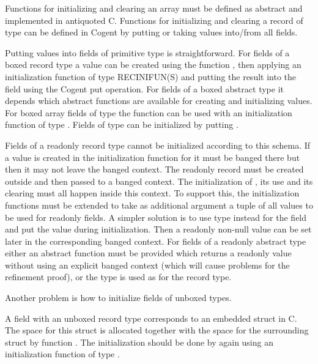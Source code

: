 Functions for initializing and clearing an array must be defined as abstract and implemented in antiquoted C. Functions
for initializing and clearing a record  of type  can be defined in Cogent by putting or taking values 
into/from all fields.

Putting values into fields of primitive type is straightforward. For fields of a boxed record type  a value can be created 
using the function , then applying an initialization function of type RECINIFUN(S) and putting the result into the field using the
Cogent put operation. For fields of a boxed abstract type it depends which abstract functions are available for creating and 
initializing values. For boxed array fields of type  the function  can be used 
with an initialization function of type . Fields of type  can be initialized by
putting .

Fields of a readonly record type  cannot be initialized according to this schema. If a value is created in the 
initialization function for  it must be banged there but then it may not leave the banged context. The readonly record must be created
outside and then passed to a banged context. The initialization of , its use and its clearing must all happen inside
this context. To support this, the initialization functions must be extended to take as additional argument a tuple of all
values to be used for readonly fields. A simpler solution is to use type  instead for the field and 
put the value  during initialization. Then a readonly non-null value can be set later in the corresponding
banged context. For fields of a readonly abstract type  either an abstract function must be provided which returns
a readonly value without using an explicit banged context (which will cause problems for the refinement proof), or the type
 is used as for the record type.

Another problem is how to initialize fields of unboxed types.

A field  with an unboxed record type  corresponds to an embedded struct in C. The space for this struct is allocated together
with the space for the surrounding struct by function . The initialization should be done by again using
an initialization function of type .

